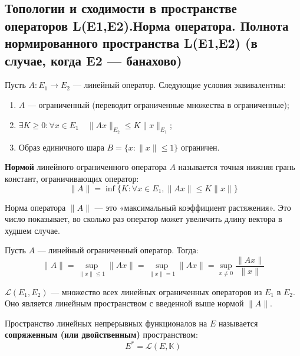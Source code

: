 
\subsection{Топологии и сходимости в пространстве операторов L(E1,E2).Норма оператора. Полнота нормированного пространства  L(E1,E2) (в случае, когда E2 — банахово)}

\begin{theorem}\label{equiv-bounded-oper}
	Пусть $A: E_1 \to E_2$ --- линейный оператор. Следующие условия эквивалентны:
	\begin{enumerate}
		\item $A$ --- ограниченный (переводит ограниченные множества в ограниченные);
		\item $\exists K \geqslant 0: \forall x \in E_1 \quad \|Ax\|_{E_2} \leqslant K \|x\|_{E_1}$;
		\item Образ единичного шара $B = \{x : \|x\| \leqslant 1\}$ ограничен.
	\end{enumerate}
\end{theorem}

\begin{definition}
	\textbf{Нормой} линейного ограниченного оператора $A$ называется точная нижняя грань констант, ограничивающих оператор:
	\[ \|A\| = \inf \{ K : \forall x \in E_1, \|Ax\| \leqslant K \|x\| \} \]
\end{definition}

\begin{idea}
	Норма оператора $\|A\|$ — это «максимальный коэффициент растяжения». Это число показывает, во сколько раз оператор может увеличить длину вектора в худшем случае.
\end{idea}


\begin{proposition}
	Пусть $A$ --- линейный ограниченный оператор. Тогда:
	\[ \|A\| = \sup_{\|x\| \leqslant 1} \|Ax\| = \sup_{\|x\| = 1} \|Ax\| = \sup_{x \neq 0} \frac{\|Ax\|}{\|x\|} \]
\end{proposition}

\begin{definition}
	$\mathcal{L}(E_1, E_2)$ --- множество всех линейных ограниченных операторов из $E_1$ в $E_2$. Оно является линейным пространством с введенной выше нормой $\|A\|$.
\end{definition}

\begin{definition}
	Пространство линейных непрерывных функционалов на $E$ называется \textbf{сопряженным (или двойственным)} пространством:
	\[ E^* = \mathcal{L}(E, \mathbb{K}) \]
\end{definition}


